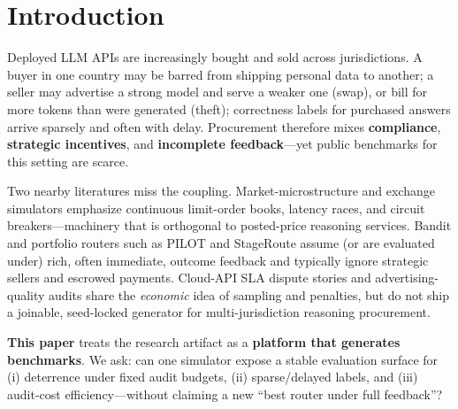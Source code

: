 \documentclass[sigconf,review]{acmart}
\begin{document}


\maketitle

\section{Introduction}
\label{sec:intro}

Deployed LLM APIs are increasingly bought and sold across jurisdictions. A buyer in one country may be barred from shipping personal data to another; a seller may advertise a strong model and serve a weaker one (swap), or bill for more tokens than were generated (theft); correctness labels for purchased answers arrive sparsely and often with delay. Procurement therefore mixes \textbf{compliance}, \textbf{strategic incentives}, and \textbf{incomplete feedback}---yet public benchmarks for this setting are scarce.

Two nearby literatures miss the coupling. Market-microstructure and exchange simulators emphasize continuous limit-order books, latency races, and circuit breakers---machinery that is orthogonal to posted-price reasoning services. Bandit and portfolio routers such as PILOT and StageRoute assume (or are evaluated under) rich, often immediate, outcome feedback and typically ignore strategic sellers and escrowed payments. Cloud-API SLA dispute stories and advertising-quality audits share the \emph{economic} idea of sampling and penalties, but do not ship a joinable, seed-locked generator for multi-jurisdiction reasoning procurement.

\textbf{This paper} treats the research artifact as a \textbf{platform that generates benchmarks}. We ask: can one simulator expose a stable evaluation surface for (i) deterrence under fixed audit budgets, (ii) sparse/delayed labels, and (iii) audit-cost efficiency---without claiming a new ``best router under full feedback''?
\end{document}
